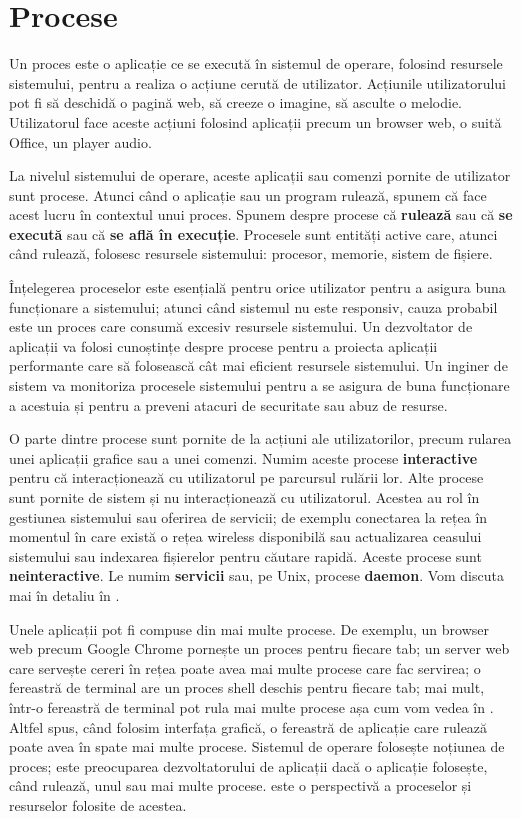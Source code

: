 \chapter{Procese}
\label{ch:process}

Un proces este o aplicație ce se execută în sistemul de operare, folosind resursele sistemului, pentru a realiza o acțiune cerută de utilizator.
Acțiunile utilizatorului pot fi să deschidă o pagină web, să creeze o imagine, să asculte o melodie.
Utilizatorul face aceste acțiuni folosind aplicații precum un browser web, o suită Office, un player audio.

La nivelul sistemului de operare, aceste aplicații sau comenzi pornite de utilizator sunt procese.
Atunci când o aplicație sau un program rulează, spunem că face acest lucru în contextul unui proces.
Spunem despre procese că \textbf{rulează} sau că \textbf{se execută} sau că \textbf{se află în execuție}.
Procesele sunt entități active care, atunci când rulează, folosesc resursele sistemului: procesor, memorie, sistem de fișiere.

Înțelegerea proceselor este esențială pentru orice utilizator pentru a asigura buna funcționare a sistemului;
atunci când sistemul nu este responsiv, cauza probabil este un proces care consumă excesiv resursele sistemului.
Un dezvoltator de aplicații va folosi cunoștințe despre procese pentru a proiecta aplicații performante care să folosească cât mai eficient resursele sistemului.
Un inginer de sistem va monitoriza procesele sistemului pentru a se asigura de buna funcționare a acestuia și pentru a preveni atacuri de securitate sau abuz de resurse.

O parte dintre procese sunt pornite de la acțiuni ale utilizatorilor, precum rularea unei aplicații grafice sau a unei comenzi.
Numim aceste procese \textbf{interactive} pentru că interacționează cu utilizatorul pe parcursul rulării lor.
Alte procese sunt pornite de sistem și nu interacționează cu utilizatorul.
Acestea au rol în gestiunea sistemului sau oferirea de servicii;
de exemplu conectarea la rețea în momentul în care există o rețea wireless disponibilă sau actualizarea ceasului sistemului sau indexarea fișierelor pentru căutare rapidă.
Aceste procese sunt \textbf{neinteractive}.
Le numim \textbf{servicii} sau, pe Unix, procese \textbf{daemon}.
Vom discuta mai în detaliu în .

Unele aplicații pot fi compuse din mai multe procese.
De exemplu, un browser web precum Google Chrome pornește un proces pentru fiecare tab;
un server web care servește cereri în rețea poate avea mai multe procese care fac servirea;
o fereastră de terminal are un proces shell deschis pentru fiecare tab;
mai mult, într-o fereastră de terminal pot rula mai multe procese așa cum vom vedea în .
Altfel spus, când folosim interfața grafică, o fereastră de aplicație care rulează poate avea în spate mai multe procese.
Sistemul de operare folosește noțiunea de proces;
este preocuparea dezvoltatorului de aplicații dacă o aplicație folosește, când rulează, unul sau mai multe procese.
 este o perspectivă a proceselor și resurselor folosite de acestea.

